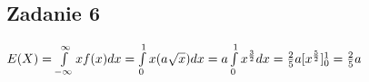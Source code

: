 \subsection{Zadanie 6}

$ E(X) = \int\limits_{-\infty}^{\infty}xf(x)dx = \int\limits_{0}^{1}x(a\sqrt{x})dx = a\int\limits_{0}^{1}x^{3\over 2}dx = 
\frac{2}{5} a[ x^{5 \over 2}]^{1}_{0} = \frac{2}{5} a  $
